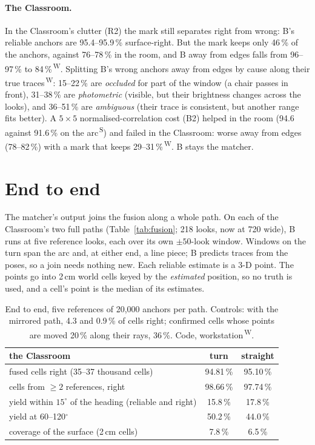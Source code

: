 \documentclass[11pt,a4paper]{article}
\newcommand{\src}[1]{\textsuperscript{\,#1}}
\newcommand{\WS}{\src{W}}   %
\newcommand{\SB}{\src{S}}   %
\begin{document}
\paragraph{The Classroom.} In the Classroom's clutter (R2) the mark still separates right from wrong: B's reliable anchors
are 95.4--95.9\,\% surface-right. But the mark keeps only 46\,\% of the anchors, against 76--78\,\% in the room, and B
away from edges falls from 96--97\,\% to 84\,\%\WS. Splitting B's wrong anchors away from edges by cause along their true
traces\WS: 15--22\,\% are \emph{occluded} for part of the window (a chair passes in front), 31--38\,\% are
\emph{photometric} (visible, but their brightness changes across the looks), and 36--51\,\% are \emph{ambiguous} (their
trace is consistent, but another range fits better). A $5\times5$ normalised-correlation cost (B2) helped in the room
(94.6 against 91.6\,\% on the arc\SB) and failed in the Classroom: worse away from edges (78--82\,\%) with a mark that keeps
29--31\,\%\WS. B stays the matcher.

\section{End to end}\label{sec:e2e}

The matcher's output joins the fusion along a whole path. On each of the Classroom's two full paths (Table~\ref{tab:fusion};
218 looks, now at 720 wide), B runs at five reference looks, each over its own $\pm50$-look window. Windows on the turn span
the arc and, at either end, a line piece; B predicts traces from the poses, so a join needs nothing new. Each reliable
estimate is a 3-D point. The points go into 2\,cm world cells keyed by the \emph{estimated} position, so no truth is used,
and a cell's point is the median of its estimates.

\begin{table}[h]
\centering\small
\begin{tabular}{@{}lcc@{}}
\toprule
the Classroom & turn & straight\\
\midrule
fused cells right (35--37 thousand cells) & 94.81\,\% & 95.10\,\%\\
cells from $\ge2$ references, right & 98.66\,\% & 97.74\,\%\\
yield within $15^\circ$ of the heading (reliable and right) & 15.8\,\% & 17.8\,\%\\
yield at 60--120$^\circ$ & 50.2\,\% & 44.0\,\%\\
coverage of the surface (2\,cm cells) & 7.8\,\% & 6.5\,\%\\
\bottomrule
\end{tabular}
\caption{End to end, five references of 20{,}000 anchors per path. Controls: with the mirrored path, 4.3 and 0.9\,\% of
cells right; confirmed cells whose points are moved 20\,\% along their rays, 36\,\%. Code, workstation\WS.}\label{tab:e2e}
\end{table}
\end{document}
